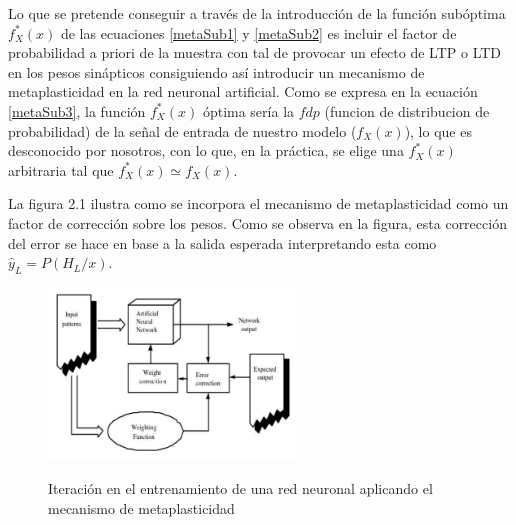 \documentclass[10pt,a4paper]{report}
\begin{document}
Lo que se pretende conseguir a través de la introducción de la función subóptima $f^*_X(x)$ de las ecuaciones \ref{metaSub1} y \ref{metaSub2} es incluir el factor de probabilidad a priori de la muestra con tal de provocar un efecto de LTP o LTD en los pesos sinápticos consiguiendo así introducir un mecanismo de metaplasticidad en la red neuronal artificial.
Como se expresa en la ecuación \ref{metaSub3}, la función $f^*_X(x)$ óptima sería la $fdp$ (funcion de distribucion de probabilidad) de la señal de entrada de nuestro modelo ($f_X(x)$), lo que es desconocido por nosotros, con lo que, en la práctica, se elige una $f^*_X(x)$ arbitraria tal que $f^*_X(x) \simeq f_X(x)$.

La figura 2.1 ilustra como se incorpora el mecanismo de metaplasticidad como un factor de corrección sobre los pesos. Como se observa en la figura, esta corrección del error se hace en base a la salida esperada interpretando esta como $\widehat{y}_L=P(H_L/x) $.

\begin{figure}[h!]{}
    \centering
    \includegraphics[width=0.6\textwidth]{img/weightingOperation.png}
    \label{fig:WeightedTrainEpoch}
    \caption{Iteración en el entrenamiento de una red neuronal aplicando el mecanismo de metaplasticidad}
\end{figure}
\end{document}
